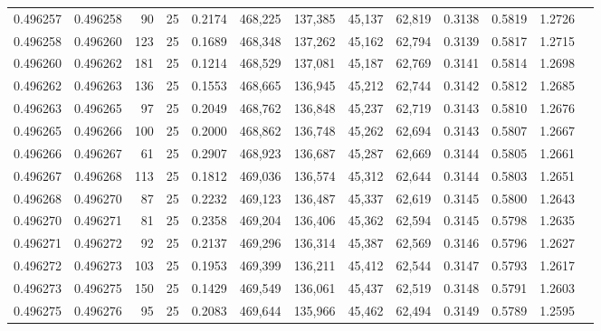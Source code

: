 \begin{tabular}{rrrrrrrrrrrrr}
0.496257 & 0.496258 &    90 &  25 &                                     0.2174 & 468,225 & 137,385 &  45,137 &  62,819 & 0.3138 & 0.5819 & 1.2726 \\
0.496258 & 0.496260 &   123 &  25 &                                     0.1689 & 468,348 & 137,262 &  45,162 &  62,794 & 0.3139 & 0.5817 & 1.2715 \\
0.496260 & 0.496262 &   181 &  25 &                                     0.1214 & 468,529 & 137,081 &  45,187 &  62,769 & 0.3141 & 0.5814 & 1.2698 \\
0.496262 & 0.496263 &   136 &  25 &                                     0.1553 & 468,665 & 136,945 &  45,212 &  62,744 & 0.3142 & 0.5812 & 1.2685 \\
0.496263 & 0.496265 &    97 &  25 &                                     0.2049 & 468,762 & 136,848 &  45,237 &  62,719 & 0.3143 & 0.5810 & 1.2676 \\
0.496265 & 0.496266 &   100 &  25 &                                     0.2000 & 468,862 & 136,748 &  45,262 &  62,694 & 0.3143 & 0.5807 & 1.2667 \\
0.496266 & 0.496267 &    61 &  25 &                                     0.2907 & 468,923 & 136,687 &  45,287 &  62,669 & 0.3144 & 0.5805 & 1.2661 \\
0.496267 & 0.496268 &   113 &  25 &                                     0.1812 & 469,036 & 136,574 &  45,312 &  62,644 & 0.3144 & 0.5803 & 1.2651 \\
0.496268 & 0.496270 &    87 &  25 &                                     0.2232 & 469,123 & 136,487 &  45,337 &  62,619 & 0.3145 & 0.5800 & 1.2643 \\
0.496270 & 0.496271 &    81 &  25 &                                     0.2358 & 469,204 & 136,406 &  45,362 &  62,594 & 0.3145 & 0.5798 & 1.2635 \\
0.496271 & 0.496272 &    92 &  25 &                                     0.2137 & 469,296 & 136,314 &  45,387 &  62,569 & 0.3146 & 0.5796 & 1.2627 \\
0.496272 & 0.496273 &   103 &  25 &                                     0.1953 & 469,399 & 136,211 &  45,412 &  62,544 & 0.3147 & 0.5793 & 1.2617 \\
0.496273 & 0.496275 &   150 &  25 &                                     0.1429 & 469,549 & 136,061 &  45,437 &  62,519 & 0.3148 & 0.5791 & 1.2603 \\
0.496275 & 0.496276 &    95 &  25 &                                     0.2083 & 469,644 & 135,966 &  45,462 &  62,494 & 0.3149 & 0.5789 & 1.2595 \\

\end{tabular}
